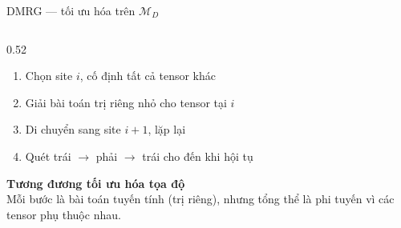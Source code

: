 \documentclass[aspectratio=169, 11pt]{beamer}
\begin{document}
\begin{frame}[fragile, shrink=5]{DMRG --- tối ưu hóa trên $\mathcal{M}_D$}
\begin{columns}[T]
\begin{column}{0.52\textwidth}
\vspace{6pt}
{\small
\begin{enumerate}
  \item Chọn site $i$, cố định tất cả tensor khác
  \item Giải bài toán trị riêng nhỏ cho tensor tại $i$
  \item Di chuyển sang site $i{+}1$, lặp lại
  \item Quét trái $\to$ phải $\to$ trái cho đến khi hội tụ
\end{enumerate}}

\vspace{6pt}
\textcolor{qgreen}{\textbf{Tương đương tối ưu hóa tọa độ}}\\[2pt]
{\small Mỗi bước là bài toán tuyến tính (trị riêng), nhưng tổng thể là phi tuyến vì các tensor phụ thuộc nhau.}

\end{column}
\end{columns}

\end{frame}
\end{document}
